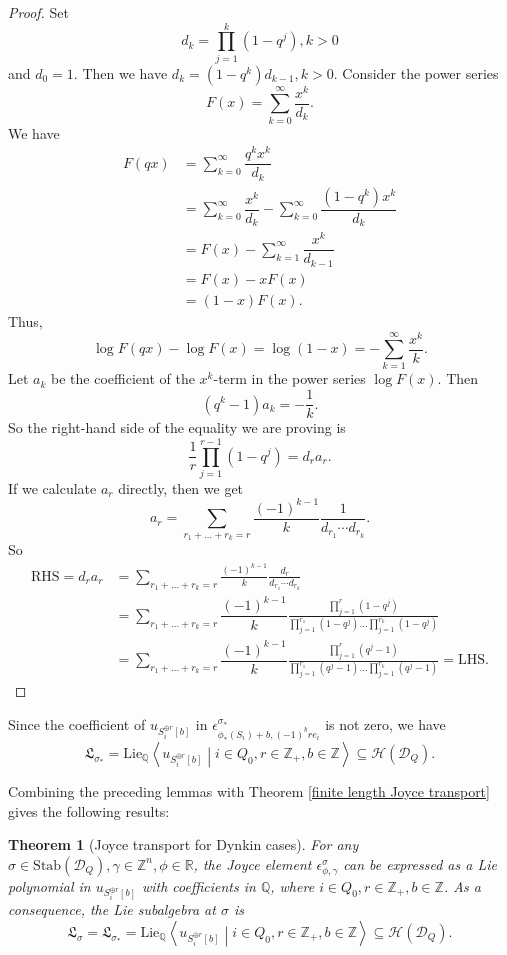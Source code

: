 \documentclass[a4paper,12pt]{amsart}
\numberwithin{equation}{section}
\newtheorem{theorem}{Theorem}[section]
\newcommand{\Stab}{\mathrm{Stab}}
\newcommand{\linp}[1]{\left\langle#1\right\rangle}
\newcommand{\1}{\mathbf{1}}
\newcommand{\RHS}{\mathrm{RHS}}
\newcommand{\LHS}{\mathrm{LHS}}
\newcommand{\Lie}{\mathrm{Lie}}
\begin{document}
\begin{proof}
    Set
    \[d_k=\prod_{j=1}^k(1-q^j),k>0\]
    and $d_0=1$. Then we have $d_k=(1-q^k)d_{k-1},k>0$. Consider the power series
    \[F(x)=\sum_{k=0}^\infty\dfrac{x^k}{d_k}.\]
    We have
    \begin{align*}
        F(qx)&=\sum_{k=0}^\infty\dfrac{q^kx^k}{d_k}\\
        &=\sum_{k=0}^\infty\dfrac{x^k}{d_k}-\sum_{k=0}^\infty\dfrac{(1-q^k)x^k}{d_k}\\
        &=F(x)-\sum_{k=1}^\infty\dfrac{x^k}{d_{k-1}}\\
        &=F(x)-xF(x)\\
        &=(1-x)F(x).
    \end{align*}
    Thus,
    \[\log F(qx)-\log F(x)=\log(1-x)=-\sum_{k=1}^\infty\dfrac{x^k}{k}.\]
    Let $a_k$ be the coefficient of the $x^k$-term in the power series $\log F(x)$. Then
    \[(q^k-1)a_k=-\dfrac{1}{k}.\]
    So the right-hand side of the equality we are proving is
    \[\dfrac{1}{r}\prod_{j=1}^{r-1}(1-q^j)=d_ra_r.\]
    If we calculate $a_r$ directly, then we get
    \[a_r=\sum_{r_1+\dots+r_k=r}\frac{(-1)^{k-1}}{k}\frac{1}{d_{r_1}\cdots d_{r_k}}.\]
    So
    \begin{align*}
        \RHS=d_ra_r&=\sum_{r_1+\dots+r_k=r}\frac{(-1)^{k-1}}{k}\frac{d_r}{d_{r_1}\cdots d_{r_k}}\\
        &=\sum_{r_1+\dots+r_k=r}\dfrac{(-1)^{k-1}}{k}\frac{\displaystyle{\prod_{j=1}^{r}(1-q^j)}}{\displaystyle{\prod_{j=1}^{r_1}(1-q^j)\dots\prod_{j=1}^{r_k}(1-q^j)}}\\
        &=\sum_{r_1+\dots+r_k=r}\dfrac{(-1)^{k-1}}{k}\frac{\displaystyle{\prod_{j=1}^{r}(q^j-1)}}{\displaystyle{\prod_{j=1}^{r_1}(q^j-1)\dots\prod_{j=1}^{r_k}(q^j-1)}}=\LHS.
    \end{align*}
\end{proof}

Since the coefficient of $u_{S_i^{\oplus r}[b]}$ in $\epsilon^{\sigma_*}_{\phi_*(S_i)+b,(-1)^b re_i}$   is not zero, we have
\[\mathfrak{L}_{\sigma_*}=\Lie_{\mathbb{Q}}\linp{u_{S_i^{\oplus r}[b]}\middle|i\in Q_0,r\in\mathbb{Z}_+,b\in\mathbb{Z}}\subseteq\mathcal{H}(\mathcal{D}_Q).\]

Combining the preceding lemmas with Theorem \ref{finite length Joyce transport} gives the following results:
\begin{theorem}[Joyce transport for Dynkin cases]
    For any $\sigma\in\Stab(\mathcal{D}_Q),\gamma\in\mathbb{Z}^n,\phi\in\mathbb{R}$, the Joyce element $\epsilon^\sigma_{\phi,\gamma}$ can be expressed as a Lie polynomial in $u_{S_i^{\oplus r}[b]}$ with coefficients in $\mathbb{Q}$, where $i\in Q_0,r\in\mathbb{Z}_+,b\in\mathbb{Z}$. As a consequence, the Lie subalgebra at $\sigma$ is
    \[\mathfrak{L}_\sigma=\mathfrak{L}_{\sigma_*}=\Lie_{\mathbb{Q}}\linp{u_{S_i^{\oplus r}[b]}\middle|i\in Q_0,r\in\mathbb{Z}_+,b\in\mathbb{Z}}\subseteq\mathcal{H}(\mathcal{D}_Q).\]
\end{theorem}
 
\end{document}
